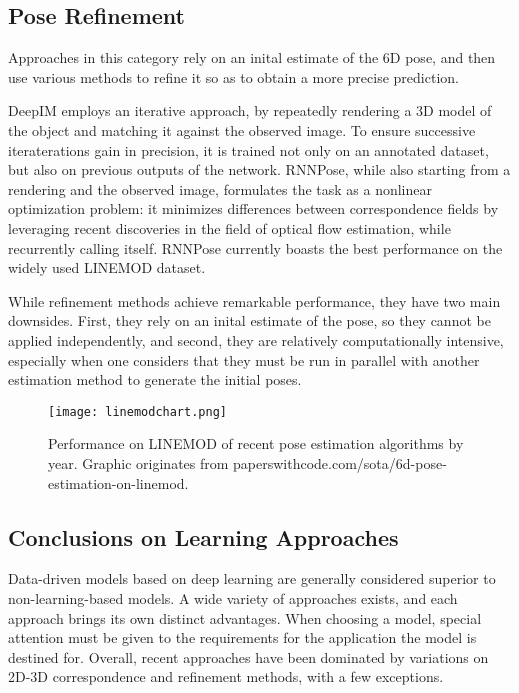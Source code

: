 \subsection{Pose Refinement}
\label{ss:poserefinement}

Approaches in this category rely on an inital estimate of the 6D pose, and then use various methods to refine it so as to obtain a more precise prediction.

DeepIM\cite{DeepIM} employs an iterative approach, by repeatedly rendering a 3D model of the object and matching it against the observed image. To ensure successive iteraterations gain in precision, it is trained not only on an annotated dataset, but also on previous outputs of the network. RNNPose\cite{RNNPose}, while also starting from a rendering and the observed image, formulates the task as a nonlinear optimization problem: it minimizes differences between correspondence fields by leveraging recent discoveries in the field of optical flow estimation, while recurrently calling itself. RNNPose currently boasts the best performance on the widely used LINEMOD\cite{linemod} dataset.

While refinement methods achieve remarkable performance, they have two main downsides. First, they rely on an inital estimate of the pose, so they cannot be applied independently, and second, they are relatively computationally intensive, especially when one considers that they must be run in parallel with another estimation method to generate the initial poses.

\begin{figure}[h]
    \centering
    \texttt{[image: linemodchart.png]}
    \caption{Performance on LINEMOD of recent pose estimation algorithms by year. Graphic originates from paperswithcode.com/sota/6d-pose-estimation-on-linemod.}
    \label{fig:linemodchart}
\end{figure}

\subsection{Conclusions on Learning Approaches}

Data-driven models based on deep learning are generally considered superior to non-learning-based models. A wide variety of approaches exists, and each approach brings its own distinct advantages. When choosing a model, special attention must be given to the requirements for the application the model is destined for. Overall, recent approaches have been dominated by variations on 2D-3D correspondence and refinement methods, with a few exceptions.

